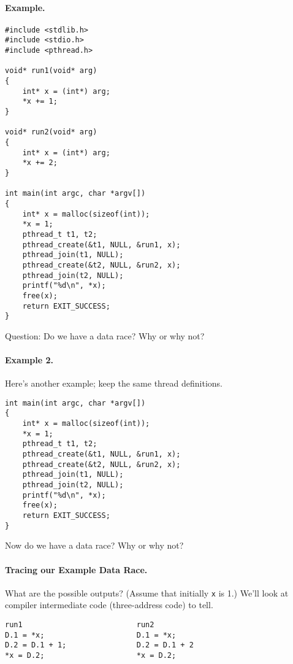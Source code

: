 \paragraph{Example.}
\begin{verbatim}
#include <stdlib.h>
#include <stdio.h>
#include <pthread.h>

void* run1(void* arg)
{
    int* x = (int*) arg;
    *x += 1;
}

void* run2(void* arg)
{
    int* x = (int*) arg;
    *x += 2;
}

int main(int argc, char *argv[])
{
    int* x = malloc(sizeof(int));
    *x = 1;
    pthread_t t1, t2;
    pthread_create(&t1, NULL, &run1, x);
    pthread_join(t1, NULL);
    pthread_create(&t2, NULL, &run2, x);
    pthread_join(t2, NULL);
    printf("%d\n", *x);
    free(x);
    return EXIT_SUCCESS;
}
\end{verbatim}

\noindent
Question: Do we have a data race? Why or why not?
\vspace*{2em}

\paragraph{Example 2.} Here's another example; keep the same thread definitions.
\begin{verbatim}
int main(int argc, char *argv[])
{
    int* x = malloc(sizeof(int));
    *x = 1;
    pthread_t t1, t2;
    pthread_create(&t1, NULL, &run1, x);
    pthread_create(&t2, NULL, &run2, x);
    pthread_join(t1, NULL);
    pthread_join(t2, NULL);
    printf("%d\n", *x);
    free(x);
    return EXIT_SUCCESS;
}
\end{verbatim}

Now do we have a data race? Why or why not?
\vspace*{2em}


\paragraph{Tracing our Example Data Race.} 
What are the possible outputs? (Assume that initially {\tt *x} is 1.)
We'll look at compiler intermediate code (three-address code) to tell.

\hspace*{.2\textwidth}\begin{minipage}{.8\textwidth}
\begin{verbatim}
run1                          run2   
D.1 = *x;                     D.1 = *x;
D.2 = D.1 + 1;                D.2 = D.1 + 2
*x = D.2;                     *x = D.2;
  \end{verbatim}
\end{minipage}

